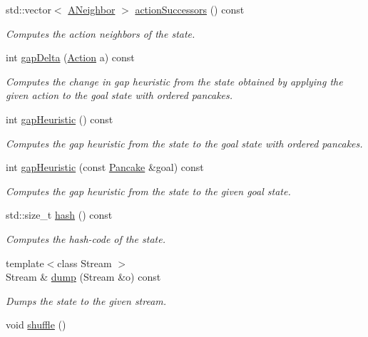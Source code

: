 \begin{DoxyCompactItemize}
std\+::vector$<$ \hyperlink{structdomain_1_1pancake_1_1Pancake_aed3aa4ec5da474b51d98578696a5683d}{A\+Neighbor} $>$ \hyperlink{structdomain_1_1pancake_1_1Pancake_a74724a902242ac1e3cebbc14215945d7}{action\+Successors} () const 
\begin{DoxyCompactList}\small\item\em Computes the action neighbors of the state. \end{DoxyCompactList}\item 
int \hyperlink{structdomain_1_1pancake_1_1Pancake_ad2a19a9216a372a52acad79d82e6df44}{gap\+Delta} (\hyperlink{structdomain_1_1pancake_1_1Pancake_a58ceacb6a181cbcdb34169b300957f95}{Action} a) const 
\begin{DoxyCompactList}\small\item\em Computes the change in gap heuristic from the state obtained by applying the given action to the goal state with ordered pancakes. \end{DoxyCompactList}\item 
int \hyperlink{structdomain_1_1pancake_1_1Pancake_ad6360e4b9e044f30c3ac99a45b164e80}{gap\+Heuristic} () const 
\begin{DoxyCompactList}\small\item\em Computes the gap heuristic from the state to the goal state with ordered pancakes. \end{DoxyCompactList}\item 
int \hyperlink{structdomain_1_1pancake_1_1Pancake_a536ab7035bad11c79c55715c7e9de27f}{gap\+Heuristic} (const \hyperlink{structdomain_1_1pancake_1_1Pancake}{Pancake} \&goal) const 
\begin{DoxyCompactList}\small\item\em Computes the gap heuristic from the state to the given goal state. \end{DoxyCompactList}\item 
std\+::size\+\_\+t \hyperlink{structdomain_1_1pancake_1_1Pancake_a2c14262529c18fa792860653de161bdd}{hash} () const 
\begin{DoxyCompactList}\small\item\em Computes the hash-\/code of the state. \end{DoxyCompactList}\item 
{\footnotesize template$<$class Stream $>$ }\\Stream \& \hyperlink{structdomain_1_1pancake_1_1Pancake_a1b75518ba1217a4e218840c0fba6a00c}{dump} (Stream \&o) const 
\begin{DoxyCompactList}\small\item\em Dumps the state to the given stream. \end{DoxyCompactList}\item 
void \hyperlink{structdomain_1_1pancake_1_1Pancake_a125f1bad5e4e504e0819d30056613ef2}{shuffle} ()\hypertarget{structdomain_1_1pancake_1_1Pancake_a125f1bad5e4e504e0819d30056613ef2}{}\label{structdomain_1_1pancake_1_1Pancake_a125f1bad5e4e504e0819d30056613ef2}


\end{DoxyCompactItemize}
